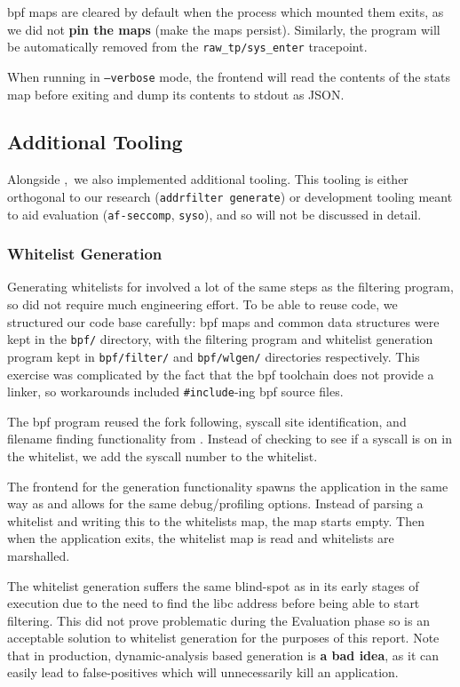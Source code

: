 \ac{bpf} maps are cleared by default when the process which mounted them exits,
as we did not \textbf{pin the maps} (make the maps persist). Similarly, the \af
program will be automatically removed from the \texttt{raw\_tp/sys\_enter}
tracepoint.

When running in \texttt{--verbose} mode, the frontend will read the contents of
the stats map before exiting and dump its contents to \ac{stdout} as JSON.

\subsection{Additional Tooling}

Alongside \afss,~we also implemented additional tooling. This tooling is either
orthogonal to our research (\texttt{addrfilter generate}) or development tooling
meant to aid evaluation (\texttt{af-seccomp}, \texttt{syso}), and so will not be
discussed in detail. 

\subsubsection{Whitelist Generation}\label{subsubsec:impl-whitelist-gen}

Generating whitelists for \af involved a lot of the same steps as the filtering
program, so did not require much engineering effort. To be able to reuse code,
we structured our code base carefully: \ac{bpf} maps and common data structures
were kept in the \texttt{bpf/} directory, with the filtering program and
whitelist generation program kept in \texttt{bpf/filter/} and
\texttt{bpf/wlgen/} directories respectively. This exercise was complicated by
the fact that the \ac{bpf} toolchain does not provide a linker, so workarounds
included \texttt{\#include}-ing \ac{bpf} source files.

The \ac{bpf} program reused the fork following, syscall site identification, and
filename finding functionality from \afss. Instead of checking to see if a
syscall is on in the whitelist, we add the syscall number to the whitelist. 

The frontend for the generation functionality spawns the application in the same
way as \af and allows for the same debug/profiling options. Instead of parsing a
whitelist and writing this to the whitelists map, the map starts empty. Then
when the application exits, the whitelist map is read and whitelists are
marshalled.

The whitelist generation suffers the same blind-spot as \af in its early stages
of execution due to the need to find the \ac{libc} address before being able to
start filtering. This did not prove problematic during the Evaluation phase so
is an acceptable solution to whitelist generation for the purposes of this
report. Note that in production, dynamic-analysis based generation is \textbf{a
bad idea}, as it can easily lead to false-positives which will unnecessarily
kill an application.

